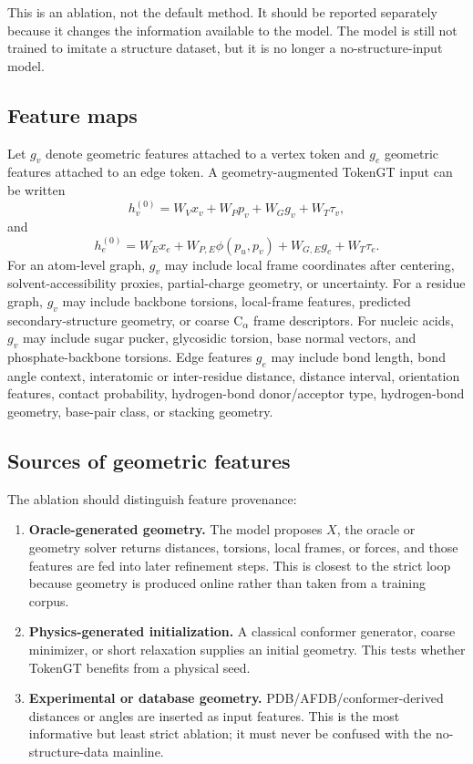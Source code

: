 \documentclass[11pt]{article}
\begin{document}
This is an ablation, not the default method. It should be reported separately because it changes the information available to the model. The model is still not trained to imitate a structure dataset, but it is no longer a no-structure-input model.

\subsection{Feature maps}

Let $g_v$ denote geometric features attached to a vertex token and $g_e$ geometric features attached to an edge token. A geometry-augmented TokenGT input can be written
\[
h_v^{(0)} = W_V x_v + W_P p_v + W_G g_v + W_T\tau_v,
\]
and
\[
h_e^{(0)} = W_E x_e + W_{P,E}\phi(p_u,p_v) + W_{G,E}g_e + W_T\tau_e.
\]
For an atom-level graph, $g_v$ may include local frame coordinates after centering, solvent-accessibility proxies, partial-charge geometry, or uncertainty. For a residue graph, $g_v$ may include backbone torsions, local-frame features, predicted secondary-structure geometry, or coarse C$_\alpha$ frame descriptors. For nucleic acids, $g_v$ may include sugar pucker, glycosidic torsion, base normal vectors, and phosphate-backbone torsions. Edge features $g_e$ may include bond length, bond angle context, interatomic or inter-residue distance, distance interval, orientation features, contact probability, hydrogen-bond donor/acceptor type, hydrogen-bond geometry, base-pair class, or stacking geometry.

\subsection{Sources of geometric features}

The ablation should distinguish feature provenance:
\begin{enumerate}[leftmargin=2em]
  \item \textbf{Oracle-generated geometry.} The model proposes $X$, the oracle or geometry solver returns distances, torsions, local frames, or forces, and those features are fed into later refinement steps. This is closest to the strict loop because geometry is produced online rather than taken from a training corpus.
  \item \textbf{Physics-generated initialization.} A classical conformer generator, coarse minimizer, or short relaxation supplies an initial geometry. This tests whether TokenGT benefits from a physical seed.
  \item \textbf{Experimental or database geometry.} PDB/AFDB/conformer-derived distances or angles are inserted as input features. This is the most informative but least strict ablation; it must never be confused with the no-structure-data mainline.
\end{enumerate}
\end{document}

